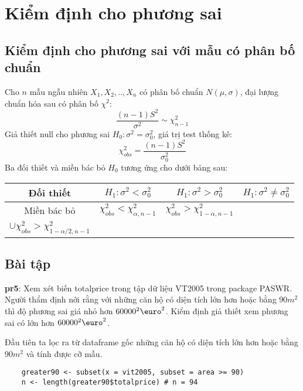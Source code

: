 \chapter{Kiểm định cho phương sai}

\section{Kiểm định cho phương sai với mẫu có phân bố chuẩn}

Cho $n$ mẫu ngẫu nhiên $X_1, X_2, .. , X_n$ có phân bố chuẩn $N(\mu, \sigma)$, 
đại lượng chuẩn hóa sau có phân bố $\chi^2$:
\begin{equation}
    \frac{(n - 1)S^2}{\sigma^2} \sim \chi^2_{n - 1}
\end{equation}
Giả thiết null cho phương sai $H_0: \sigma^2 = \sigma_0^2$, giá trị test thống kê:
$$\chi_{obs}^2 = \frac{(n - 1)S^2}{\sigma_0^2}$$
Ba đối thiết và miền bác bỏ $H_0$ tương ứng cho dưới bảng sau:
\begin{center}
    \begin{tabular}{| c | c | c | c |}
        \hline
        Đối thiết & $H_1: \sigma^2 < \sigma_0^2$ & $H_1: \sigma^2 > \sigma_0^2$ & $H_1: \sigma^2 \neq \sigma_0^2$ \\
        \hline
        Miền bác bỏ & $\chi_{obs}^2 < \chi_{\alpha, n - 1}^2$ & $\chi_{obs}^2 > \chi_{1 - \alpha, n - 1}^2$ & 
        \makecell{$\chi_{obs}^2 < \chi_{\alpha/2, n - 1}^2$ \\
        $\cup \chi_{obs}^2 > \chi_{1 - \alpha/2, n - 1}^2$} \\
        \hline
    \end{tabular}
\end{center}

\section{Bài tập}

\textbf{pr5}: Xem xét biến totalprice trong tập dữ liệu VT2005 trong package PASWR. Người thẩm định nới rằng với những
căn hộ có diện tích lớn hơn hoặc bằng $90m^2$ thì độ phương sai giá nhỏ hơn $60000^2\text{\euro}^2$.
Kiểm định giả thiết xem phương sai có lớn hơn $60000^2\text{\euro}^2$. 

Đầu tiên ta lọc ra từ dataframe gốc những căn hộ có diện tích lớn hơn hoặc bằng $90m^2$ 
và tính được cỡ mẫu.

\begin{lstlisting}
    greater90 <- subset(x = vit2005, subset = area >= 90)
    n <- length(greater90$totalprice) # n = 94
\end{lstlisting}


